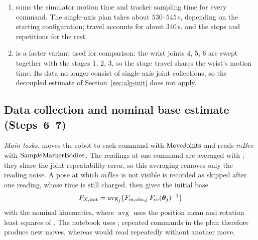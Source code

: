 \documentclass[../main.tex]{subfiles}
\begin{document}
\begin{enumerate}
\item {} sums the simulator motion time and tracker sampling time for every command. The single-axis plan takes about $530$--$545$\,s, depending on the starting configuration; travel accounts for about $340$\,s, and the stops and repetitions for the rest.
\item {} is a faster variant used for comparison: the wrist joints 4, 5, 6 are swept together with the stages 1, 2, 3, so the stage travel shares the wrist's motion time. Its data no longer consist of single-axis joint collections, so the decoupled estimate of Section~\ref{sec:alg-init} does not apply.
\end{enumerate}

\subsection{Data collection and nominal base estimate (Steps~6--7)}\label{sec:alg-collect}
\noindent\textit{Main tasks.}  moves the robot to each command with $\operatorname{MoveJoints}$ and reads $mBee$ with $\operatorname{SampleMarkerBodies}$. The  readings at one command are averaged with ; they share the joint repeatability error, so this averaging removes only the reading noise. A pose at which $mBee$ is not visible is recorded as skipped after one reading, whose time is still charged.  then gives the initial base
\begin{equation}
F_{X,\mathrm{init}}=\operatorname{avg}_j\bigl(F_{m,\mathrm{obs},j}\,F_{\mathrm{ee}}(\bm{\theta}_j)^{-1}\bigr)
\end{equation}
with the nominal kinematics, where $\operatorname{avg}$ uses the position mean and rotation least squares of . The notebook uses ; repeated commands in the plan therefore produce new moves, whereas  would read repeatedly without another move.
\end{document}
